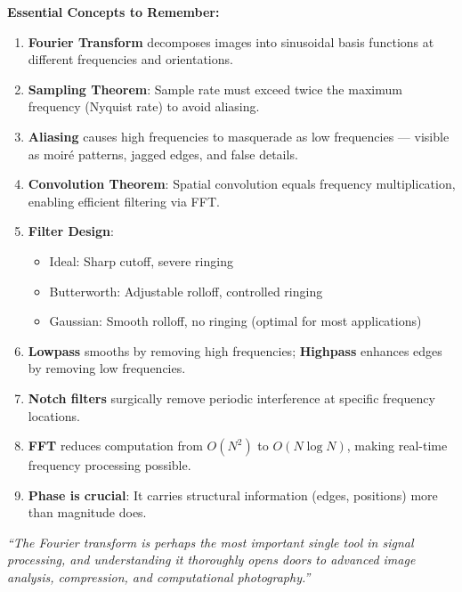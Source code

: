 \documentclass[12pt,a4paper]{article}
\begin{document}
\begin{importantbox}
\textbf{Essential Concepts to Remember:}

\begin{enumerate}
    \item \textbf{Fourier Transform} decomposes images into sinusoidal basis functions at different frequencies and orientations.
    
    \item \textbf{Sampling Theorem}: Sample rate must exceed twice the maximum frequency (Nyquist rate) to avoid aliasing.
    
    \item \textbf{Aliasing} causes high frequencies to masquerade as low frequencies --- visible as moiré patterns, jagged edges, and false details.
    
    \item \textbf{Convolution Theorem}: Spatial convolution equals frequency multiplication, enabling efficient filtering via FFT.
    
    \item \textbf{Filter Design}:
    \begin{itemize}
        \item Ideal: Sharp cutoff, severe ringing
        \item Butterworth: Adjustable rolloff, controlled ringing
        \item Gaussian: Smooth rolloff, no ringing (optimal for most applications)
    \end{itemize}
    
    \item \textbf{Lowpass} smooths by removing high frequencies; \textbf{Highpass} enhances edges by removing low frequencies.
    
    \item \textbf{Notch filters} surgically remove periodic interference at specific frequency locations.
    
    \item \textbf{FFT} reduces computation from $O(N^2)$ to $O(N \log N)$, making real-time frequency processing possible.
    
    \item \textbf{Phase is crucial}: It carries structural information (edges, positions) more than magnitude does.
\end{enumerate}
\end{importantbox}

\vspace{1cm}

\begin{center}
\textit{``The Fourier transform is perhaps the most important single tool in signal processing, and understanding it thoroughly opens doors to advanced image analysis, compression, and computational photography.''}
\end{center}
\end{document}
